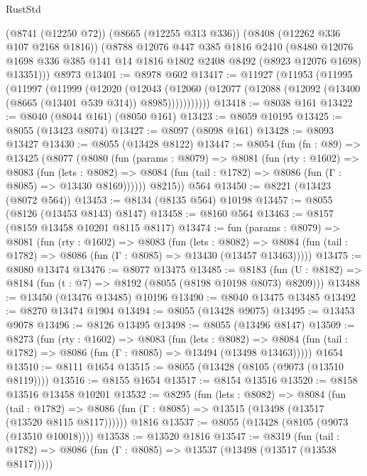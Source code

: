 \begin{lexlean}{RustStd}
\begin{coremodule}
      (@8741 (@12250 @72))
      (@8665 (@12255 @313 @336))
      (@8408 (@12262 @336 @107 @2168 @1816))
      (@8788
        @12076
        @447
        @385
        @1816
        @2410
        (@8480
          @12076
          @1698
          @336
          @385
          @141
          @14
          @1816
          @1802
          @2408
          @8492
          (@8923 @12076 @1698)
          @13351)))
    @8973
@13401 := @8978 @602
@13417 := @11927
    (@11953
      (@11995
        (@11997
          (@11999
            (@12020
              (@12043
                (@12060 (@12077 (@12088 (@12092 (@13400 (@8665 (@13401 @539 @314)) @8985)))))))))))
@13418 := @8038 @161
@13422 := @8040 (@8044 @161) (@8050 @161)
@13423 := @8059 @10195
@13425 := @8055 (@13423 @8074)
@13427 := @8097 (@8098 @161)
@13428 := @8093 @13427
@13430 := @8055 (@13428 @8122)
@13447 := @8054
    (fun (fn : @89) =>
    @13425
      (@8077
        (@8080
          (fun (params : @8079) =>
          @8081
            (fun (rty : @1602) =>
            @8083
              (fun (lets : @8082) =>
              @8084 (fun (tail : @1782) => @8086 (fun (Γ : @8085) => @13430 @8169))))))
        @8215))
    @564
@13450 := @8221 (@13423 (@8072 @564))
@13453 := @8134 (@8135 @564) @10198
@13457 := @8055 (@8126 (@13453 @8143) @8147)
@13458 := @8160 @564
@13463 := @8157 (@8159 @13458 @10201 @8115 @8117)
@13474 := fun (params : @8079) =>
  @8081
    (fun (rty : @1602) =>
    @8083
      (fun (lets : @8082) =>
      @8084 (fun (tail : @1782) => @8086 (fun (Γ : @8085) => @13430 (@13457 @13463)))))
@13475 := @8080 @13474
@13476 := @8077 @13475
@13485 := @8183
    (fun (U : @8182) => @8184 (fun (t : @7) => @8192 (@8055 (@8198 @10198 @8073) @8209)))
@13488 := @13450 (@13476 @13485) @10196
@13490 := @8040 @13475 @13485
@13492 := @8270 @13474 @1904
@13494 := @8055 (@13428 @9075)
@13495 := @13453 @9078
@13496 := @8126 @13495
@13498 := @8055 (@13496 @8147)
@13509 := @8273
    (fun (rty : @1602) =>
    @8083
      (fun (lets : @8082) =>
      @8084 (fun (tail : @1782) => @8086 (fun (Γ : @8085) => @13494 (@13498 @13463)))))
    @1654
@13510 := @8111 @1654
@13515 := @8055 (@13428 (@8105 (@9073 (@13510 @8119))))
@13516 := @8155 @1654
@13517 := @8154 @13516
@13520 := @8158 @13516 @13458 @10201
@13532 := @8295
    (fun (lets : @8082) =>
    @8084
      (fun (tail : @1782) =>
      @8086 (fun (Γ : @8085) => @13515 (@13498 (@13517 (@13520 @8115 @8117))))))
    @1816
@13537 := @8055 (@13428 (@8105 (@9073 (@13510 @10018))))
@13538 := @13520 @1816
@13547 := @8319
    (fun (tail : @1782) => @8086 (fun (Γ : @8085) => @13537 (@13498 (@13517 (@13538 @8117)))))

\end{coremodule}
\end{lexlean}
